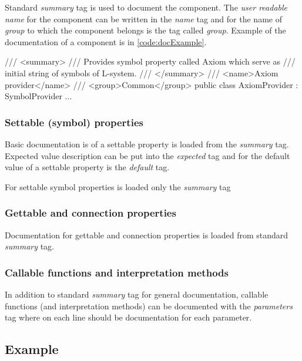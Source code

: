 Standard \emph{summary} tag is used to document the component.
The \emph{user readable name} for the component can be written in the \emph{name} tag and for the name of \emph{group} to which the component belongs is the tag called \emph{group}.
Example of the documentation of a component is in \autoref{code:docExample}.

\begin{Csharp}[label=code:docExample,caption={Example of usage the XmlDoc for documentation of a component}]
/// <summary>
///	Provides symbol property called Axiom which serve as
/// initial string of symbols of L-system.
/// </summary>
/// <name>Axiom provider</name>
/// <group>Common</group>
public class AxiomProvider : SymbolProvider {
	...
}
\end{Csharp}



\subsubsection{Settable (symbol) properties}

Basic documentation is of a settable property is loaded from the \emph{summary} tag.
Expected value description can be put into the \emph{expected} tag and for the default value of a settable property is the \emph{default} tag.

For settable symbol properties is loaded only the \emph{summary} tag


\subsubsection{Gettable and connection properties}

Documentation for gettable and connection properties is loaded from standard \emph{summary} tag.


\subsubsection{Callable functions and interpretation methods}

In addition to standard \emph{summary} tag for general documentation, callable functions (and interpretation methods) can be documented with the \emph{parameters} tag where on each line should be documentation for each parameter. 


\subsection{Example}

